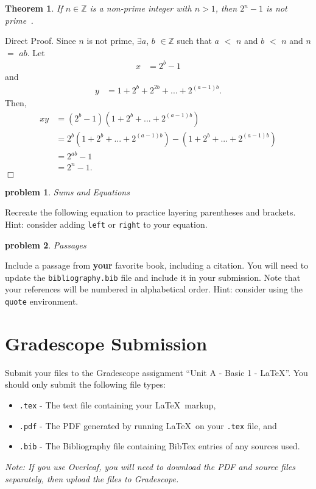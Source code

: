 \documentclass[10pt]{article}
\newenvironment{proof}{\par\noindent{\it Proof.}\hspace*{1em}}{$\Box$\bigskip}
\newtheorem{problem}{\sc\color{cit}problem}
\newtheorem{theorem}{Theorem}
\newcommand{\Z}{\mathbb{Z}} %
\begin{document}
\begin{theorem}
    If $n \in \Z$ is a non-prime integer with $n>1$, then $2^n - 1$ is not prime~\cite{velleman}.
\end{theorem}

\begin{proof}
    Direct Proof. Since $n$ is not prime, $\exists$$a$, $b$ $\in \Z$ such that $a$ $<$ $n$ and $b$ $<$ $n$ and $n$ $=$ $ab$. Let
    \begin{align*}
        x &= 2^b - 1
    \end{align*}
    and
    \begin{align*}
        y &= 1 + 2^b + 2^{2b} + ... + 2^{(a - 1)b}.
    \end{align*}
    Then, 
    \begin{align}
        xy &= (2^b - 1)(1 + 2^b + ... + 2^{(a - 1)b}) \\
           &= 2^b(1 + 2^b + ... + 2^{(a - 1)b}) - (1 + 2^b + ... + 2^{(a - 1)b}) \\
           &= 2^{ab} - 1 \\
           &= 2^n - 1.
    \end{align}
\end{proof}







\begin{problem} Sums and Equations \end{problem}

Recreate the following equation to practice layering parentheses and brackets.  Hint: consider adding \verb|left| or \verb|right| to your equation.






\begin{problem} Passages \end{problem}
    Include a passage from \textbf{your} favorite book, including a citation.  You will need to update the \verb|bibliography.bib| file and include it in your submission. Note that your references will be numbered in alphabetical order.  Hint: consider using the \verb|quote| environment.






\section*{Gradescope Submission}
Submit your files to the Gradescope assignment ``Unit A - Basic 1 - LaTeX''.  You should only submit the following file types:
\begin{itemize}
    \item \verb|.tex| - The text file containing your \LaTeX~markup,
    \item \verb|.pdf| - The PDF generated by running \LaTeX~on your \verb|.tex| file, and
    \item \verb|.bib| - The Bibliography file containing BibTex entries of any sources used.
\end{itemize}
\textit{Note: If you use Overleaf, you will need to download the PDF and source files separately, then upload the files to Gradescope.}
\end{document}
